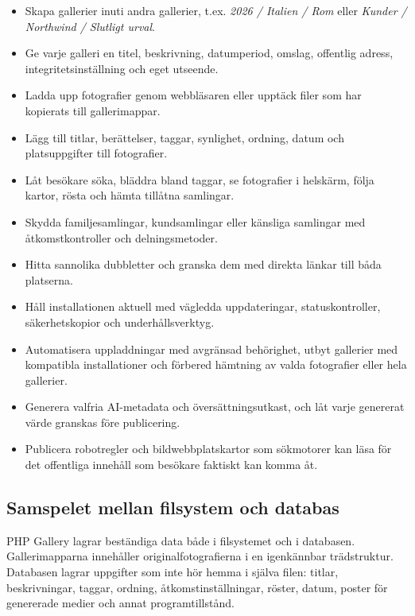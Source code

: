 \documentclass[11pt,a4paper]{article}
\begin{document}
\begin{itemize}
  \item Skapa gallerier inuti andra gallerier, t.ex. \emph{2026 / Italien / Rom}
  eller \emph{Kunder / Northwind / Slutligt urval}.
  \item Ge varje galleri en titel, beskrivning, datumperiod, omslag, offentlig
  adress, integritetsinställning och eget utseende.
  \item Ladda upp fotografier genom webbläsaren eller upptäck filer som har
  kopierats till gallerimappar.
  \item Lägg till titlar, berättelser, taggar, synlighet, ordning, datum och
  platsuppgifter till fotografier.
  \item Låt besökare söka, bläddra bland taggar, se fotografier i helskärm,
  följa kartor, rösta och hämta tillåtna samlingar.
  \item Skydda familjesamlingar, kundsamlingar eller känsliga samlingar med
  åtkomstkontroller och delningsmetoder.
  \item Hitta sannolika dubbletter och granska dem med direkta länkar till båda
  platserna.
  \item Håll installationen aktuell med vägledda uppdateringar,
  statuskontroller, säkerhetskopior och underhållsverktyg.
  \item Automatisera uppladdningar med avgränsad behörighet, utbyt gallerier med
  kompatibla installationer och förbered hämtning av valda fotografier eller
  hela gallerier.
  \item Generera valfria AI-metadata och översättningsutkast, och låt varje
  genererat värde granskas före publicering.
  \item Publicera robotregler och bildwebbplatskartor som sökmotorer kan läsa
  för det offentliga innehåll som besökare faktiskt kan komma åt.
\end{itemize}

\subsection{Samspelet mellan filsystem och databas}

PHP Gallery lagrar beständiga data både i filsystemet och i databasen.
Gallerimapparna innehåller originalfotografierna i en igenkännbar trädstruktur.
Databasen lagrar uppgifter som inte hör hemma i själva filen: titlar,
beskrivningar, taggar, ordning, åtkomstinställningar, röster, datum, poster för
genererade medier och annat programtillstånd.
\end{document}
